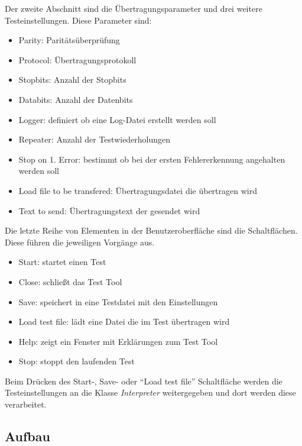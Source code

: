 Der zweite Abschnitt sind die Übertragungsparameter und drei weitere Testeinstellungen. Diese Parameter sind:

\begin{itemize}
\item Parity: Paritätsüberprüfung
\item Protocol: Übertragungsprotokoll
\item Stopbits: Anzahl der Stopbits
\item Databits: Anzahl der Datenbits
\item Logger: definiert ob eine Log-Datei erstellt werden soll
\item Repeater: Anzahl der Testwiederholungen
\item Stop on 1. Error: bestimmt ob bei der ersten Fehlererkennung angehalten werden soll
\item Load file to be transfered: Übertragungsdatei die übertragen wird
\item Text to send: Übertragungstext der gesendet wird\\
\end{itemize}

Die letzte Reihe von Elementen in der Benutzeroberfläche sind die Schaltflächen. Diese führen die jeweiligen Vorgänge aus.

\begin{itemize}
\item Start: startet einen Test
\item Close: schließt das Test Tool
\item Save: speichert in eine Testdatei mit den Einstellungen
\item Load test file: lädt eine Datei die im Test übertragen wird
\item Help: zeigt ein Fenster mit Erklärungen zum Test Tool
\item Stop: stoppt den laufenden Test\\
\end{itemize}

Beim Drücken des Start-, Save- oder "`Load test file"' Schaltfläche werden die Testeinstellungen an die Klasse \textit{Interpreter} weitergegeben und dort werden diese verarbeitet.


\subsection{Aufbau}

